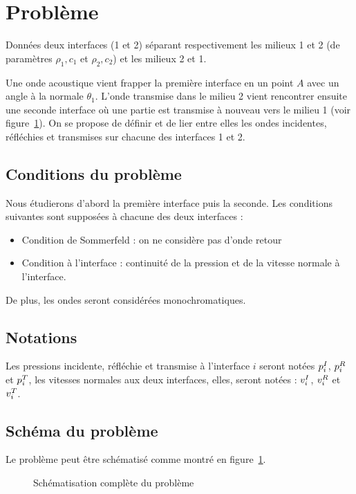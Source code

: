 \section{Problème}

Données deux interfaces (1 et 2) séparant respectivement les milieux 1 et 2 (de paramètres $\rho_1,c_1$ et $\rho_2,c_2$)
et les milieux 2 et 1.

Une onde acoustique vient frapper la première interface en un point $A$ avec un angle à la normale $\theta_1$. L'onde
transmise dans le milieu 2 vient rencontrer ensuite une seconde interface où une partie est transmise à nouveau vers le
milieu 1 (voir figure~\ref{complete}). On se propose de définir et de lier entre elles les ondes incidentes, réfléchies
et transmises sur chacune des interfaces 1 et 2.

\subsection{Conditions du problème}

Nous étudierons d'abord la première interface puis la seconde. Les conditions suivantes sont supposées à
chacune des deux interfaces :

\begin{itemize}
    \item Condition de Sommerfeld : on ne considère pas d'onde retour
    \item Condition à l'interface : continuité de la pression et de la vitesse normale à l'interface.
\end{itemize}

De plus, les ondes seront considérées monochromatiques.

\subsection{Notations}

Les pressions incidente, réfléchie et transmise à l'interface $i$ seront notées $p^I_i$, $p^R_i$ et $p^T_i$, les
vitesses normales aux deux interfaces, elles, seront notées : $v^I_i$, $v^R_i$ et $v^T_i$.

\subsection{Schéma du problème}

Le problème peut être schématisé comme montré en figure~\ref{complete}.

\begin{figure}[!b]
    \centering{}
    \caption{\label{complete} Schématisation complète du problème}
\end{figure}

